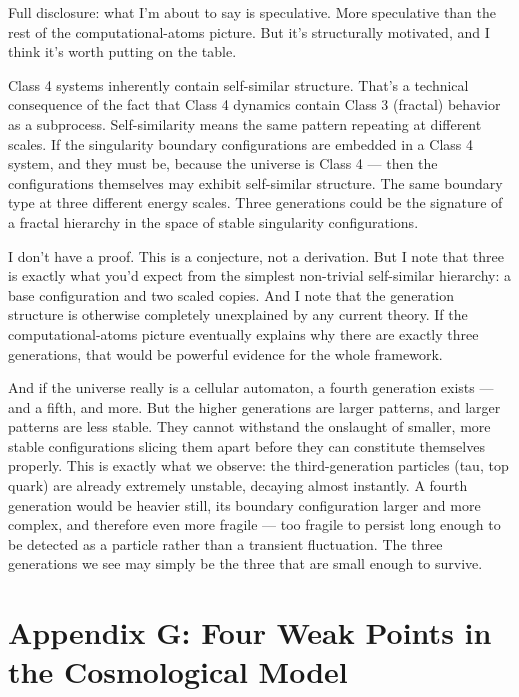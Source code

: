 \documentclass[11pt, twoside, openright]{book}
\begin{document}
Full disclosure: what I'm about to say is speculative. More speculative than the rest of the computational-atoms picture. But it's structurally motivated, and I think it's worth putting on the table.

Class 4 systems inherently contain self-similar structure. That's a technical consequence of the fact that Class 4 dynamics contain Class 3 (fractal) behavior as a subprocess. Self-similarity means the same pattern repeating at different scales. If the singularity boundary configurations are embedded in a Class 4 system, and they must be, because the universe is Class 4 --- then the configurations themselves may exhibit self-similar structure. The same boundary type at three different energy scales. Three generations could be the signature of a fractal hierarchy in the space of stable singularity configurations.

I don't have a proof. This is a conjecture, not a derivation. But I note that three is exactly what you'd expect from the simplest non-trivial self-similar hierarchy: a base configuration and two scaled copies. And I note that the generation structure is otherwise completely unexplained by any current theory. If the computational-atoms picture eventually explains why there are exactly three generations, that would be powerful evidence for the whole framework.

And if the universe really is a cellular automaton, a fourth generation exists --- and a fifth, and more. But the higher generations are larger patterns, and larger patterns are less stable. They cannot withstand the onslaught of smaller, more stable configurations slicing them apart before they can constitute themselves properly. This is exactly what we observe: the third-generation particles (tau, top quark) are already extremely unstable, decaying almost instantly. A fourth generation would be heavier still, its boundary configuration larger and more complex, and therefore even more fragile --- too fragile to persist long enough to be detected as a particle rather than a transient fluctuation. The three generations we see may simply be the three that are small enough to survive.


\chapter*{Appendix G: Four Weak Points in the Cosmological Model}
\end{document}
